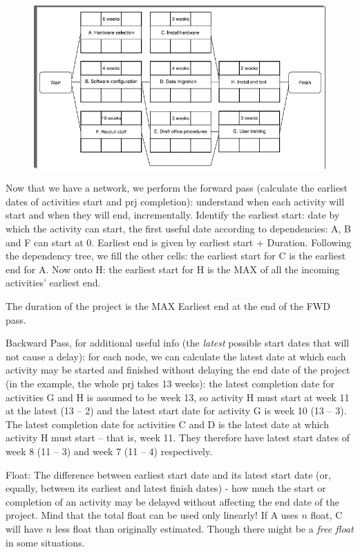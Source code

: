 \begin{figure} [H]
    \centering
    \includegraphics[scale=0.7]{Figures/03/cpm03.png}
    \label{fig:cpm03}
\end{figure}

Now that we have a network, we perform the forward pass (calculate the earliest dates of activities start and prj completion): understand when each activity will start and when they will end, incrementally. Identify the earliest start: date by which the activity can start, the first useful date according to dependencies: A, B and F can start at 0. Earliest end is given by earliest start + Duration. Following the dependency tree, we fill the other cells: the earliest start for C is the earliest end for A. Now onto H: the earliest start for H is the MAX of all the incoming activities' earliest end.

\noindent The duration of the project is the MAX Earliest end at the end of the FWD pass.

\noindent Backward Pass, for additional useful info (the \textit{latest} possible start dates that will not cause a delay): for each node, we can calculate the latest date at which each activity may be started and finished without delaying the end date of the project (in the example, the whole prj takes 13 weeks):  the latest completion date for activities G and H is assumed to be week 13, so activity H must start at week 11 at the latest (13 – 2) and the latest start date for activity G is week 10 (13 – 3). The latest completion date for activities C and D is the latest date at which activity H must start – that is, week 11. They therefore have latest start dates of week 8 (11 – 3) and week 7 (11 – 4) respectively.

\noindent Float: The difference between earliest start date and its latest start date (or, equally, between its earliest and latest finish dates) -  how much the start or completion of an activity may be delayed without affecting the end date of the project. Mind that the total float can be used only linearly! If A uses $n$ float, C will have $n$ less float than originally estimated. Though there might be a \textit{free float} in some situations.


